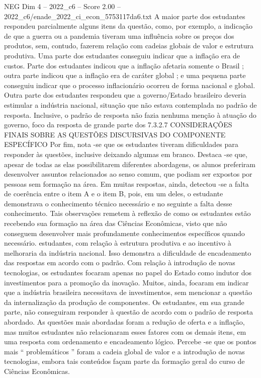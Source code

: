 \begin{textsample}{NEG Dim 4 – 2022\_c6 – Score 2.00 – 2022\_c6/enade\_2022\_ci\_econ\_5753117da6.txt}
A maior parte dos estudantes respondeu parcialmente alguns itens da questão, como, por exemplo, a indicação de que a guerra ou a pandemia tiveram uma influência sobre os preços dos produtos, sem, contudo, fazerem relação com cadeias globais de valor e estrutura produtiva.
Uma parte dos estudantes conseguiu indicar que a inflação era de custos.
Parte dos estudantes indicou que a inflação afetaria somente o Brasil ; outra parte indicou que a inflação era de caráter global ; e uma pequena parte conseguiu indicar que o processo inflacionário ocorreu de forma nacional e global.
Outra parte dos estudantes respondeu que a governo/Estado brasileiro deveria estimular a indústria nacional, situação que não estava contemplada no padrão de resposta.
Inclusive, o padrão de resposta não fazia nenhuma menção à atuação do governo, foco da resposta de grande parte dos 7.3.2.7 CONSIDERAÇÕES FINAIS SOBRE AS QUESTÕES DISCURSIVAS DO COMPONENTE ESPECÍFICO Por fim, nota -se que os estudantes tiveram dificuldades para responder às questões, inclusive deixando algumas em branco.
Destaca -se que, apesar de todas as elas possibilitarem diferentes abordagens, os alunos preferiram desenvolver assuntos relacionados ao senso comum, que podiam ser expostos por pessoas sem formação na área.
Em muitas respostas, ainda, detectou -se a falta de coerência entre o item A e o item B, pois, em um deles, o estudante demonstrava o conhecimento técnico necessário e no seguinte a falta desse conhecimento.
Tais observações remetem à reflexão de como os estudantes estão recebendo sua formação na área das Ciências Econômicas, visto que não conseguem desenvolver mais profundamente conhecimentos específicos quando necessário. estudantes, com relação à estrutura produtiva e ao incentivo à melhoraria da indústria nacional.
Isso demonstra a dificuldade de encadeamento das respostas em acordo com o padrão.
Com relação à introdução de novas tecnologias, os estudantes focaram apenas no papel do Estado como indutor dos investimentos para a promoção da inovação.
Muitos, ainda, focaram em indicar que a indústria brasileira necessitava de investimentos, sem mencionar a questão da internalização da produção de componentes.
Os estudantes, em sua grande parte, não conseguiram responder à questão de acordo com o padrão de resposta abordado.
As questões mais abordadas foram a redução de oferta e a inflação, mas muitos estudantes não relacionaram esses fatores com os demais itens, em uma resposta com ordenamento e encadeamento lógico.
Percebe -se que os pontos mais “ problemáticos ” foram a cadeia global de valor e a introdução de novas tecnologias, embora tais conteúdos façam parte da formação geral do curso de Ciências Econômicas.

\end{textsample}
